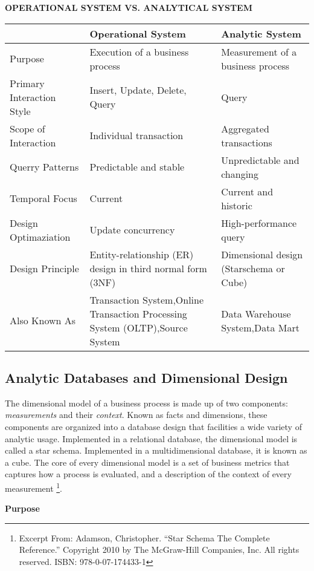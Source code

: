 \documentclass[letterpaper,10pt,oneside]{sphinxmanual}
\begin{document}
\textbf{OPERATIONAL SYSTEM VS. ANALYTICAL SYSTEM}

\begin{tabulary}{\linewidth}{|L|L|L|}
\hline
 & 
Operational System
 & 
Analytic System
\\
\hline
Purpose
 & 
Execution of a business process
 & 
Measurement of a business process
\\
\hline
Primary Interaction Style
 & 
Insert, Update, Delete, Query
 & 
Query
\\
\hline
Scope of Interaction
 & 
Individual transaction
 & 
Aggregated transactions
\\
\hline
Querry Patterns
 & 
Predictable and stable
 & 
Unpredictable and changing
\\
\hline
Temporal Focus
 & 
Current
 & 
Current and historic
\\
\hline
Design Optimaziation
 & 
Update concurrency
 & 
High-performance query
\\
\hline
Design Principle
 & 
Entity-relationship (ER) design in third normal form (3NF)
 & 
Dimensional design
(Starschema or Cube)
\\
\hline
Also Known As
 & 
Transaction System,Online Transaction Processing System (OLTP),Source System
 & 
Data Warehouse System,Data Mart
\\
\hline\end{tabulary}



\subsection{Analytic Databases and Dimensional Design}
\label{introduction:analytic-databases-and-dimensional-design}
The dimensional model of a business process is made up of two components: \emph{measurements} and their \emph{context}.
Known as facts and dimensions, these components are organized into a database design that
facilities a wide variety of analytic usage. Implemented in a relational database, the dimensional
model is called a star schema. Implemented in a multidimensional database, it is known as a cube.
The core of every dimensional model is a set of business metrics that captures how a process is evaluated,
and a description of the context of every measurement \footnote[6]{\sphinxAtStartFootnote%
Excerpt From: Adamson, Christopher. “Star Schema The Complete Reference.” Copyright 2010 by The McGraw-Hill Companies, Inc. All rights reserved. ISBN: 978-0-07-174433-1
}.

\textbf{Purpose}
\end{document}
